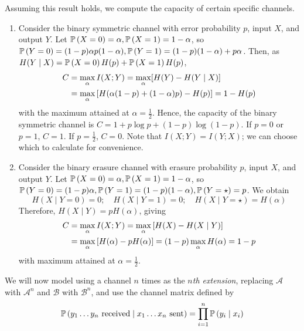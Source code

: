 \begin{example}
    Assuming this result holds, we compute the capacity of certain specific channels.
    \begin{enumerate}
        \item Consider the binary symmetric channel with error probability \( p \), input \( X \), and output \( Y \).
        Let \( \mathbb{P}\left({X = 0}\right) = \alpha, \mathbb{P}\left({X = 1}\right) = 1 - \alpha \), so \( \mathbb{P}\left({Y = 0}\right) = (1-p)\alpha p(1-\alpha), \mathbb{P}\left({Y = 1}\right) = (1-p)(1-\alpha) + p\alpha \).
        Then, as \( H(Y \mid X) = \mathbb{P}\left({X=0}\right) H(p) + \mathbb{P}\left({X = 1}\right) H(p) \),
        \begin{align*}
            C &= \max_\alpha I(X;Y) = \max_\alpha [H(Y) - H(Y\mid X)] \\
            &= \max_\alpha \qty[H(\alpha(1-p) + (1-\alpha)p) - H(p)] = 1 - H(p)
        \end{align*}
        with the maximum attained at \( \alpha = \frac{1}{2} \).
        Hence, the capacity of the binary symmetric channel is \( C = 1 + p \log p + (1-p) \log (1-p) \).
        If \( p = 0 \) or \( p = 1 \), \( C = 1 \).
        If \( p = \frac{1}{2} \), \( C = 0 \).
        Note that \( I(X;Y) = I(Y;X) \); we can choose which to calculate for convenience.
        \item Consider the binary erasure channel with erasure probability \( p \), input \( X \), and output \( Y \).
        Let \( \mathbb{P}\left({X = 0}\right) = \alpha, \mathbb{P}\left({X = 1}\right) = 1 - \alpha \), so \( \mathbb{P}\left({Y = 0}\right) = (1-p)\alpha, \mathbb{P}\left({Y = 1}\right) = (1-p)(1-\alpha), \mathbb{P}\left({Y = \star}\right) = p \).
        We obtain
        \[ H(X \mid Y = 0) = 0;\quad H(X \mid Y = 1) = 0;\quad H(X \mid Y = \star) = H(\alpha) \]
        Therefore, \( H(X \mid Y) = pH(\alpha) \), giving
        \begin{align*}
            C &= \max_\alpha I(X;Y) = \max_\alpha \qty[H(X) - H(X \mid Y)] \\
            &= \max_\alpha \qty[H(\alpha) - pH(\alpha)] = (1-p) \max_\alpha H(\alpha) = 1-p
        \end{align*}
        with maximum attained at \( \alpha = \frac{1}{2} \).
    \end{enumerate}
\end{example}
We will now model using a channel \( n \) times as the \emph{\( n \)th extension}, replacing \( \mathcal A \) with \( \mathcal A^n \) and \( \mathcal B \) with \( \mathcal B^n \), and use the channel matrix defined by
\[ \mathbb{P}\left({y_1 \dots y_n \text{ received} \mid x_1 \dots x_n \text{ sent}}\right) = \prod_{i=1}^n \mathbb{P}\left({y_i \mid x_i}\right) \]
